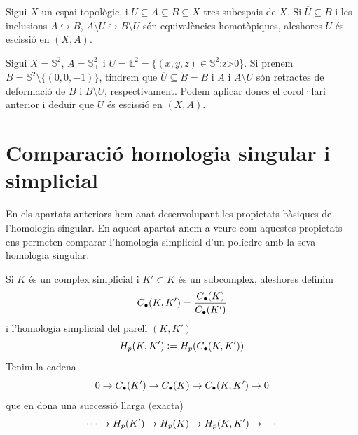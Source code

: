 \documentclass[../main.tex]{subfiles}
\begin{document}
\begin{coro}
Sigui $X$ un espai topològic, i $U\subseteq A\subseteq B\subseteq X$ tres subespais de $X$. Si $\overline{U}\subseteq\mathring{B}$ i les inclusions $A\hookrightarrow B$, $A\setminus U\hookrightarrow B\setminus U$ són equivalències homotòpiques, aleshores $U$ és escissió en $(X,A)$.
\end{coro}

\begin{ej}
Sigui $X = \mathbb{S}^2$, $A = \mathbb{S}^2_+$ i $U = \mathbb{E}^2 = \{(x,y,z)\in\mathbb{S}^2$\;:\;z>0\}. Si prenem $B = \mathbb{S}^2\setminus\{(0,0,-1)\}$, tindrem que $\overline{U}\subseteq \mathring{B} = B$ i $A$ i $A\setminus U$ són retractes de deformació de $B$ i $B\setminus U$, respectivament. Podem aplicar doncs el corol·lari anterior i deduir que $U$ és escissió en $(X,A)$.
\end{ej}

\section{Comparació homologia singular i simplicial}

En els apartats anteriors hem anat desenvolupant les propietats bàsiques de l'homologia singular. En aquest apartat anem a veure com aquestes propietats ens permeten comparar l'homologia simplicial d'un políedre amb la seva homologia singular.

Si $K$ és un complex simplicial i $K'\subset K$ és un subcomplex, aleshores definim
\begin{equation}
    \notag
    C_\bullet(K, K') = \frac{C_\bullet(K)}{C_\bullet(K')}
\end{equation}
i l'homologia simplicial del parell $(K,K')$
\begin{equation}
    \notag
    H_p(K,K') := H_p(C_\bullet(K,K'))
\end{equation}
Tenim la cadena
\begin{equation}
    \notag
    0\rightarrow C_\bullet(K')\rightarrow C_\bullet(K)\rightarrow C_\bullet(K,K')\rightarrow 0
\end{equation}
que en dona una successió llarga (exacta)
\begin{equation}
    \notag
    \cdots\rightarrow H_p(K')\rightarrow H_p(K)\rightarrow H_p(K,K')\rightarrow \cdots
\end{equation}
\end{document}
